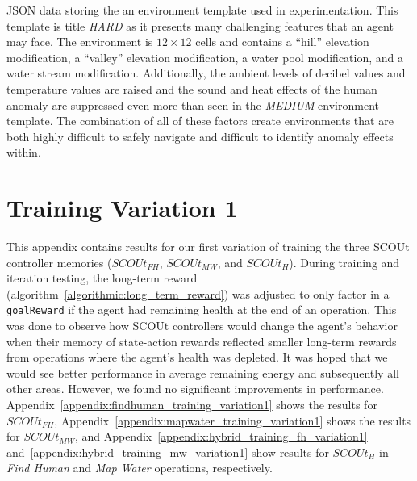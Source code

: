 \begin{appxlst}
  \caption{JSON data storing the an environment template used in experimentation. This template is title \textit{HARD} as it presents many challenging features that an agent may face. The environment is $12\times12$ cells and contains a ``hill'' elevation modification, a ``valley'' elevation modification, a water pool modification, and a water stream modification. Additionally, the ambient levels of decibel values and temperature values are raised and the sound and heat effects of the human anomaly are suppressed even more than seen in the \textit{MEDIUM} environment template. The combination of all of these factors create environments that are both highly difficult to safely navigate and difficult to identify anomaly effects within.}
   \label{appendix:hard_environmenttemplate}
\end{appxlst}






\pagebreak
\tocless\section{Training Variation 1} \label{sec:training_variation1}
This appendix contains results for our first variation of training the three SCOUt controller memories ($SCOUt_{FH}$, $SCOUt_{MW}$, and $SCOUt_{H}$).
During training and iteration testing, the long-term reward (algorithm~\ref{algorithmic:long_term_reward}) was adjusted to only factor in a \texttt{goalReward} if the agent had remaining health at the end of an operation.
This was done to observe how SCOUt controllers would change the agent's behavior when their memory of state-action rewards reflected smaller long-term rewards from operations where the agent's health was depleted.
It was hoped that we would see better performance in average remaining energy and subsequently all other areas.
However, we found no significant improvements in performance.
Appendix~\ref{appendix:findhuman_training_variation1} shows the results for $SCOUt_{FH}$, Appendix~\ref{appendix:mapwater_training_variation1} shows the results for $SCOUt_{MW}$, and Appendix~\ref{appendix:hybrid_training_fh_variation1} and~\ref{appendix:hybrid_training_mw_variation1} show results for $SCOUt_{H}$ in \textit{Find Human} and \textit{Map Water} operations, respectively.

